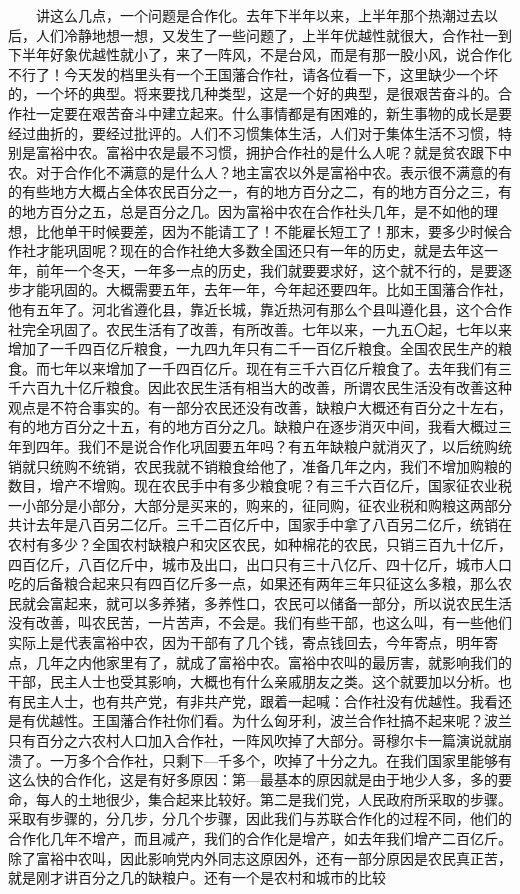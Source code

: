 \documentclass[cn,11pt,chinese]{elegantbook}
\begin{document}
　　讲这么几点，一个问题是合作化。去年下半年以来，上半年那个热潮过去以后，人们冷静地想一想，又发生了一些问题了，上半年优越性就很大，合作社一到下半年好象优越性就小了，来了一阵风，不是台风，而是有那一股小风，说合作化不行了！今天发的档里头有一个王国藩合作社，请各位看一下，这里缺少一个坏的，一个坏的典型。将来要找几种类型，这是一个好的典型，是很艰苦奋斗的。合作社一定要在艰苦奋斗中建立起来。什么事情都是有困难的，新生事物的成长是要经过曲折的，要经过批评的。人们不习惯集体生活，人们对于集体生活不习惯，特别是富裕中农。富裕中农是最不习惯，拥护合作社的是什么人呢？就是贫农跟下中农。对于合作化不满意的是什么人？地主富农以外是富裕中农。表示很不满意的有的有些地方大概占全体农民百分之一，有的地方百分之二，有的地方百分之三，有的地方百分之五，总是百分之几。因为富裕中农在合作社头几年，是不如他的理想，比他单干时候要差，因为不能请工了！不能雇长短工了！那末，要多少时候合作社才能巩固呢？现在的合作社绝大多数全国还只有一年的历史，就是去年这一年，前年一个冬天，一年多一点的历史，我们就要要求好，这个就不行的，是要逐步才能巩固的。大概需要五年，去年一年，今年起还要四年。比如王国藩合作社，他有五年了。河北省遵化县，靠近长城，靠近热河有那么个县叫遵化县，这个合作社完全巩固了。农民生活有了改善，有所改善。七年以来，一九五〇起，七年以来增加了一千四百亿斤粮食，一九四九年只有二千一百亿斤粮食。全国农民生产的粮食。而七年以来增加了一千四百亿斤。现在有三千六百亿斤粮食了。去年我们有三千六百九十亿斤粮食。因此农民生活有相当大的改善，所谓农民生活没有改善这种观点是不符合事实的。有一部分农民还没有改善，缺粮户大概还有百分之十左右，有的地方百分之十五，有的地方百分之几。缺粮户在逐步消灭中间，我看大概过三年到四年。我们不是说合作化巩固要五年吗？有五年缺粮户就消灭了，以后统购统销就只统购不统销，农民我就不销粮食给他了，准备几年之内，我们不增加购粮的数目，增产不增购。现在农民手中有多少粮食呢？有三千六百亿斤，国家征农业税一小部分是小部分，大部分是买来的，购来的，征同购，征农业税和购粮这两部分共计去年是八百另二亿斤。三千二百亿斤中，国家手中拿了八百另二亿斤，统销在农村有多少？全国农村缺粮户和灾区农民，如种棉花的农民，只销三百九十亿斤，四百亿斤，八百亿斤中，城市及出口，出口只有三十八亿斤、四十亿斤，城市人口吃的后备粮合起来只有四百亿斤多一点，如果还有两年三年只征这么多粮，那么农民就会富起来，就可以多养猪，多养性口，农民可以储备一部分，所以说农民生活没有改善，叫农民苦，一片苦声，不会是。我们有些干部，也这么叫，有一些他们实际上是代表富裕中农，因为干部有了几个钱，寄点钱回去，今年寄点，明年寄点，几年之内他家里有了，就成了富裕中农。富裕中农叫的最厉害，就影响我们的干部，民主人士也受其影响，大概也有什么亲戚朋友之类。这个就要加以分析。也有民主人士，也有共产党，有非共产党，跟着一起喊：合作社没有优越性。我看还是有优越性。王国藩合作社你们看。为什么匈牙利，波兰合作社搞不起来呢？波兰只有百分之六农村人口加入合作社，一阵风吹掉了大部分。哥穆尔卡一篇演说就崩溃了。一万多个合作社，只剩下—千多个，吹掉了十分之九。在我们国家里能够有这么快的合作化，这是有好多原因：第—最基本的原因就是由于地少人多，多的要命，每人的土地很少，集合起来比较好。第二是我们党，人民政府所采取的步骤。采取有步骤的，分几步，分几个步骤，因此我们与苏联合作化的过程不同，他们的合作化几年不增产，而且减产，我们的合作化是增产，如去年我们增产二百亿斤。除了富裕中农叫，因此影响党内外同志这原因外，还有一部分原因是农民真正苦，就是刚才讲百分之几的缺粮户。还有一个是农村和城市的比较
\end{document}

